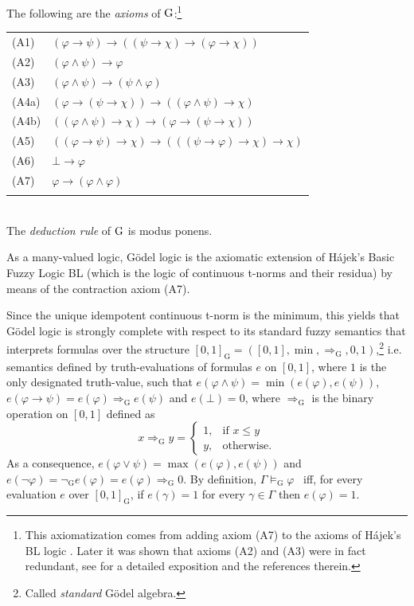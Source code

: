 \documentclass{article}
\theoremstyle{definition}
\begin{document}
The following are the {\em axioms\/} of $\rm{G}$:\footnote{This axiomatization comes from adding axiom (A7) to the axioms of H\'ajek's BL logic \cite{Hajek98}. Later it was shown that axioms (A2) and (A3) were in fact redundant, see \cite{BeCiHa}  for a detailed exposition and the references therein.} \\

\begin{tabular}{l l}
(A1) &$(\varphi \rightarrow \psi) \rightarrow ((\psi \rightarrow
\chi) \rightarrow (\varphi \rightarrow \chi))$
\\
(A2) &$(\varphi \wedge \psi) \rightarrow \varphi$
\\
(A3) &$(\varphi \wedge \psi) \rightarrow (\psi \wedge \varphi)$
\\
(A4a) &$(\varphi \rightarrow (\psi \rightarrow \chi ))
\to ((\varphi \wedge \psi) \rightarrow \chi)$
\\
(A4b) &$((\varphi \wedge \psi) \rightarrow \chi) \rightarrow
(\varphi\rightarrow (\psi \rightarrow \chi))$
\\
(A5) & $((\varphi \rightarrow \psi) \rightarrow \chi) \rightarrow
 (((\psi \rightarrow \varphi ) \rightarrow
\chi) \rightarrow \chi)$
\\
(A6) & $\bot \rightarrow \varphi$ 
\\
(A7) & $\varphi \to (\varphi \wedge \varphi)$
\\ \\
\end{tabular}
\ \\
The {\em deduction rule\/} of $\rm{G}$ is modus ponens.

As a many-valued logic, G\"odel logic is the axiomatic extension of H\'ajek's Basic Fuzzy Logic BL \cite{Hajek98} (which is the logic of continuous t-norms and their residua)  by means of the contraction axiom (A7).

Since the unique idempotent continuous t-norm is the minimum, this yields that G\"odel logic is strongly complete with respect to its standard fuzzy semantics that interprets formulas over the structure $[0, 1]_\mathrm{G} = ([0, 1], \min, \Rightarrow_\mathrm{G}, 0, 1)$,\footnote{Called {\em standard} G\"odel algebra.} i.e. semantics defined by truth-evaluations of formulas $e$ on $[0, 1]$, where $1$ is the only designated truth-value, such that $e(\varphi \land \psi) = \min(e(\varphi), e(\psi))$,  $e(\varphi \to \psi) = e(\varphi) \Rightarrow_\mathrm{G} e(\psi)$ and $e(\bot) = 0$, where $\Rightarrow_\mathrm{G}$ is the binary operation on $[0, 1]$ defined as
$$ x \Rightarrow_\mathrm{G} y = \left \{
\begin{array}{ll}
1, & \mbox{if } x \leq y \\
y, & \mbox{otherwise}.
\end{array}
\right .
$$
As a consequence, $e(\varphi \lor \psi) = \max(e(\varphi), e(\psi))$ and $e(\neg \varphi) = \neg_\mathrm{G} e(\varphi) = e(\varphi) \Rightarrow_\mathrm{G} 0$. By definition, $\Gamma \models_\mathrm{G} \varphi$ \ iff, for every evaluation $e$ over $[0, 1]_\mathrm{G}$, if $e(\gamma) =1$ for every $\gamma \in \Gamma$  then $e(\varphi)=1$.
\end{document}
